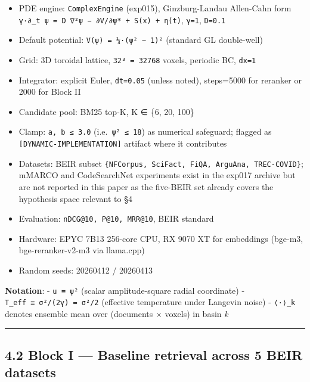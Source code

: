 \documentclass[
]{article}
\providecommand{\tightlist}{%
  \setlength{\itemsep}{0pt}\setlength{\parskip}{0pt}}
\begin{document}
\begin{itemize}
\tightlist
\item
  PDE engine: \texttt{ComplexEngine} (exp015), Ginzburg-Landau
  Allen-Cahn form
  \texttt{γ·∂\_t\ ψ\ =\ D\ ∇²ψ\ −\ ∂V/∂ψ*\ +\ S(x)\ +\ η(t)},
  \texttt{γ=1}, \texttt{D=0.1}
\item
  Default potential: \texttt{V(ψ)\ =\ ¼·(\textbar{}ψ\textbar{}²\ −\ 1)²}
  (standard GL double-well)
\item
  Grid: 3D toroidal lattice, \texttt{32³\ =\ 32768} voxels, periodic BC,
  \texttt{dx=1}
\item
  Integrator: explicit Euler, \texttt{dt=0.05} (unless noted),
  steps=5000 for reranker or 2000 for Block II
\item
  Candidate pool: BM25 top-K, K ∈ \{6, 20, 100\}
\item
  Clamp: \texttt{\textbar{}a\textbar{},\ \textbar{}b\textbar{}\ ≤\ 3.0}
  (i.e.~\texttt{\textbar{}ψ\textbar{}²\ ≤\ 18}) as numerical safeguard;
  flagged as \texttt{{[}DYNAMIC-IMPLEMENTATION{]}} artifact where it
  contributes
\item
  Datasets: BEIR subset
  \texttt{\{NFCorpus,\ SciFact,\ FiQA,\ ArguAna,\ TREC-COVID\}}; mMARCO
  and CodeSearchNet experiments exist in the exp017 archive but are not
  reported in this paper as the five-BEIR set already covers the
  hypothesis space relevant to §4
\item
  Evaluation: \texttt{nDCG@10,\ P@10,\ MRR@10}, BEIR standard
\item
  Hardware: EPYC 7B13 256-core CPU, RX 9070 XT for embeddings (bge-m3,
  bge-reranker-v2-m3 via llama.cpp)
\item
  Random seeds: 20260412 / 20260413
\end{itemize}

\textbf{Notation}: - \texttt{u\ ≡\ \textbar{}ψ\textbar{}²} (scalar
amplitude-square radial coordinate) -
\texttt{T\_eff\ ≡\ σ²/(2γ)\ =\ σ²/2} (effective temperature under
Langevin noise) - \texttt{⟨·⟩\_k} denotes ensemble mean over (documents
× voxels) in basin \emph{k}

\begin{center}\rule{0.5\linewidth}{0.5pt}\end{center}

\hypertarget{block-i-baseline-retrieval-across-5-beir-datasets}{%
\subsection{4.2 Block I --- Baseline retrieval across 5 BEIR
datasets}\label{block-i-baseline-retrieval-across-5-beir-datasets}}
\end{document}
